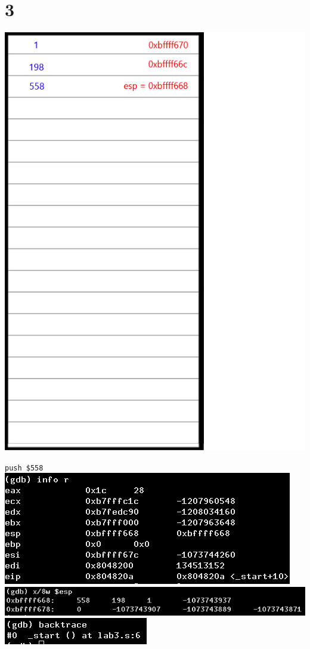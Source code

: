 \documentclass{article}
\begin{document}
\section*{3}
\begin{minipage}{5cm}
\includegraphics[scale=0.3]{s3.png}
\end{minipage}
\begin{minipage}{8cm}
\verb|push $558|\\
\includegraphics[scale=0.4]{info3.png} \\
\includegraphics[scale=0.3]{x3.png} \\
\includegraphics[scale=0.5]{bt3.png} \\
\end{minipage}
\clearpage
\end{document}
